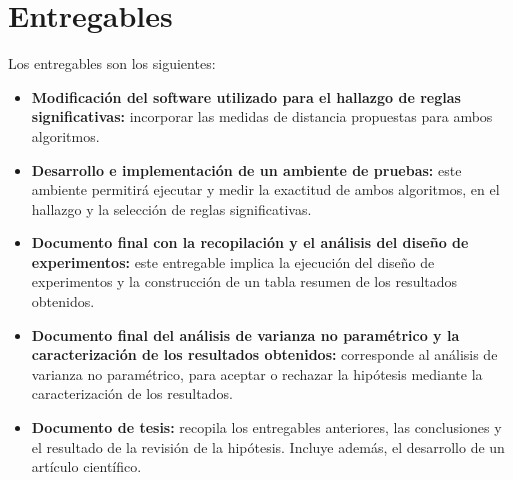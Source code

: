 \section{\textbf{Entregables}}
Los entregables son los siguientes:
\begin{itemize}
\item \textbf{Modificaci\'on del software utilizado para el hallazgo de reglas significativas:} incorporar las medidas de distancia propuestas para ambos algoritmos.
\item \textbf{Desarrollo e implementaci\'on de un ambiente de pruebas:} este ambiente permitir\'a ejecutar y medir la exactitud de ambos algoritmos, en el hallazgo y la selecci\'on de reglas significativas.
\item \textbf{Documento final con la recopilaci\'on y el an\'alisis del dise\~no de experimentos:} este entregable implica la ejecuci\'on del dise\~no de experimentos y la construcci\'on de un tabla resumen de los resultados obtenidos. 
\item \textbf{Documento final del an\'alisis de varianza no param\'etrico y la caracterizaci\'on de los resultados obtenidos:} corresponde al an\'alisis de varianza no param\'etrico, para aceptar o rechazar la hip\'otesis mediante la caracterizaci\'on de los resultados.
\item \textbf{Documento de tesis:} recopila los entregables anteriores, las conclusiones y el resultado de la revisi\'on de la hip\'otesis. Incluye adem\'as, el desarrollo de un art\'iculo cient\'ifico.
\end{itemize}
